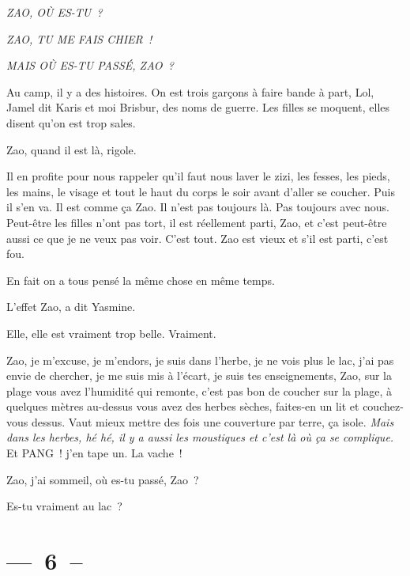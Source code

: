 \documentclass[french,twoside]{book} %
\begin{document}
{\itshape ZAO, OÙ ES-TU ?}\par
{\itshape ZAO, TU ME FAIS CHIER !}\par
{\itshape MAIS OÙ ES-TU PASSÉ, ZAO ?}\par
\bigbreak
\noindent Au camp, il y a des histoires. On est trois garçons à faire bande à part, Lol, Jamel dit Karis et moi Brisbur, des noms de guerre. Les filles se moquent, elles disent qu’on est trop sales.\par
Zao, quand il est là, rigole.\par
Il en profite pour nous rappeler qu’il faut nous laver le zizi, les fesses, les pieds, les mains, le visage et tout le haut du corps le soir avant d’aller se coucher. Puis il s’en va. Il est comme ça Zao. Il n’est pas toujours là. Pas toujours avec nous. Peut-être les filles n’ont pas tort, il est réellement parti, Zao, et c’est peut-être aussi ce que je ne veux pas voir. C’est tout. Zao est vieux et s’il est parti, c’est fou.\par
\bigbreak
\noindent En fait on a tous pensé la même chose en même temps.\par
L’effet Zao, a dit Yasmine.\par
Elle, elle est vraiment trop belle. Vraiment.\par
Zao, je m’excuse, je m’endors, je suis dans l’herbe, je ne vois plus le lac, j’ai pas envie de chercher, je me suis mis à l’écart, je suis tes enseignements, Zao, sur la plage vous avez l’humidité qui remonte, c’est pas bon de coucher sur la plage, à quelques mètres au-dessus vous avez des herbes sèches, faites-en un lit et couchez-vous dessus. Vaut mieux mettre des fois une couverture par terre, ça isole. \emph{Mais dans les herbes, hé hé, il y a aussi les moustiques et c’est là où ça se complique.} Et PANG ! j’en tape un. La vache !\par
\bigbreak
Zao, j’ai sommeil, où es-tu passé, Zao ?\par
Es-tu vraiment au lac ?

\section[{— 6 –}]{— 6 –}
\renewcommand{\leftmark}{— 6 –}
\end{document}
